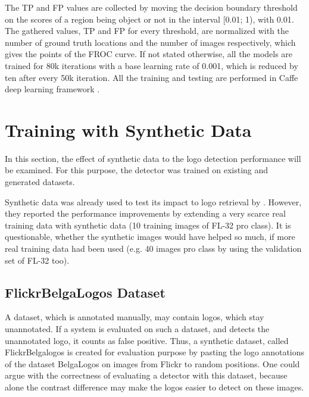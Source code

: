 \bigbreak
The TP and FP values are collected by moving the decision boundary threshold on the scores of a region being object or not in the interval [0.01; 1), with 0.01. The gathered values, TP and FP for every threshold, are normalized with the number of ground truth locations and the number of images respectively, which gives the points of the FROC curve.
\bigbreak
If not stated otherwise, all the models are trained for 80k iterations with a base learning rate of 0.001, which is reduced by ten after every 50k iteration. All the training and testing are performed in Caffe deep learning framework \cite{Jia:2014:CCA:2647868.2654889}.
\bigbreak
\section{Training with Synthetic Data}\label{s:syntheticdata}
In this section, the effect of synthetic data to the logo detection performance will be examined. For this purpose, the detector was trained on existing and generated datasets.

Synthetic data was already used to test its impact to logo retrieval by \cite{DBLP:journals/corr/SuZG16}. However, they reported the performance improvements by extending a very scarce real training data with synthetic data (10 training images of FL-32 pro class). It is questionable, whether the synthetic images would have helped so much, if more real training data had been used (e.g. 40 images pro class by using the validation set of FL-32 too).
\bigbreak
\subsection{FlickrBelgaLogos Dataset}\label{ss:flickrbelgalogos}

A dataset, which is annotated manually, may contain logos, which stay unannotated. If a system is evaluated on such a dataset, and detects the unannotated logo, it counts as false positive. Thus, a synthetic dataset, called FlickrBelgalogos \cite{letessier2012scalable} is created for evaluation purpose by pasting the logo annotations of the dataset BelgaLogos \cite{belgalogos09} on images from Flickr to random positions. One could argue with the correctness of evaluating a detector with this dataset, because alone the contrast difference may make the logos easier to detect on these images.

